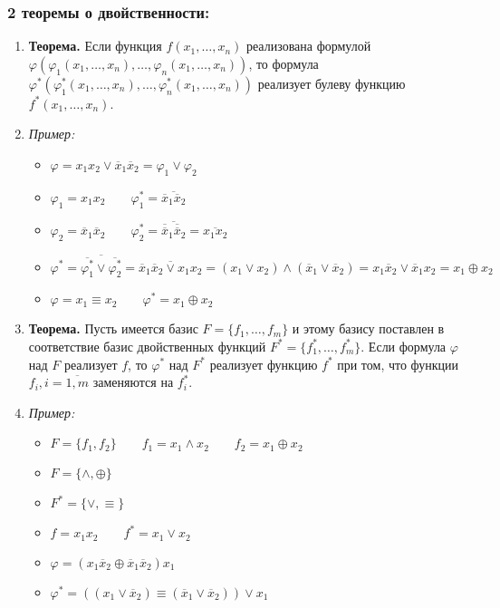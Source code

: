 \documentclass[10pt]{article}
\begin{document}
\subsubsection*{2 теоремы о двойственности:}
\begin{enumerate}
    \item \textbf{Теорема.} Если функция $f(x_1, \dots, x_n)$ реализована формулой $\varphi (\varphi_1(x_1, \dots, x_n), \dots, \varphi_n(x_1, \dots, x_n))$, то формула $\varphi^* (\varphi_1^*(x_1, \dots, x_n), \dots, \varphi_n^*(x_1, \dots, x_n))$ реализует булеву функцию $f^*(x_1, \dots, x_n)$.
    \item[] \textit{Пример:}
        \begin{itemize}
            \item $\varphi = x_1 x_2 \lor \overline x_1 \overline x_2 = \varphi_1 \lor \varphi_2$
            \item $\varphi_1 = x_1 x_2 \qquad \varphi_1^* = \overline {\overline x_1 \overline x_2}$
            \item $\varphi_2 = \overline x_1 \overline x_2 \qquad \varphi_2^* = \overline {\overline {\overline x}_1 \overline {\overline x}_2} = \overline {x_1 x_2}$
            \item $\varphi^* = \overline {\overline {\varphi_1^*} \lor \overline {\varphi_2^*}} = \overline {\overline x_1 \overline x_2 \lor x_1 x_2} = (x_1 \lor x_2) \land (\overline x_1 \lor \overline x_2) = x_1 \overline x_2 \lor \overline x_1 x_2 = x_1 \oplus x_2$
            \item $\varphi = x_1 \equiv x_2 \qquad \varphi^* = x_1 \oplus x_2$
        \end{itemize}
    \item \textbf{Теорема.} Пусть имеется базис $F = \{ f_1, \dots, f_m \}$ и этому базису поставлен в соответствие базис двойственных функций $F^* = \{ f_1^*, \dots, f_m^* \}$. Если формула $\varphi$ над $F$ реализует $f$, то $\varphi^*$ над $F^*$ реализует функцию $f^*$ при том, что функции $f_i, i = \overline {1, m}$ заменяются на $f_i^*$.
    \item[] \textit{Пример:}
        \begin{itemize}
            \item $F = \{ f_1, f_2 \} \qquad f_1 = x_1 \land x_2 \qquad f_2 = x_1 \oplus x_2$
            \item $F = \{ \land, \oplus \}$
            \item $F^* = \{ \lor, \equiv \}$
            \item $f = x_1 x_2 \qquad f^* = x_1 \lor x_2$
            \item $\varphi = (x_1 \overline x_2 \oplus \overline x_1 \overline x_2) x_1$
            \item $\varphi^* = ((x_1 \lor \overline x_2) \equiv (\overline x_1 \lor \overline x_2)) \lor x_1$
        \end{itemize}
\end{enumerate}
\end{document}
